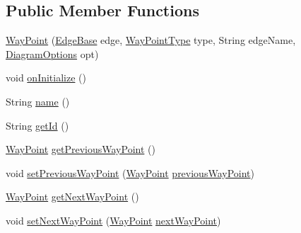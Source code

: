 \subsection*{Public Member Functions}
\begin{DoxyCompactItemize}
\item 
\hyperlink{classorg_1_1tzi_1_1use_1_1gui_1_1views_1_1diagrams_1_1waypoints_1_1_way_point_a4cf28cbed1ee0e244add67a47d843032}{Way\-Point} (\hyperlink{classorg_1_1tzi_1_1use_1_1gui_1_1views_1_1diagrams_1_1elements_1_1edges_1_1_edge_base}{Edge\-Base} edge, \hyperlink{enumorg_1_1tzi_1_1use_1_1gui_1_1views_1_1diagrams_1_1waypoints_1_1_way_point_type}{Way\-Point\-Type} type, String edge\-Name, \hyperlink{classorg_1_1tzi_1_1use_1_1gui_1_1views_1_1diagrams_1_1_diagram_options}{Diagram\-Options} opt)
\item 
void \hyperlink{classorg_1_1tzi_1_1use_1_1gui_1_1views_1_1diagrams_1_1waypoints_1_1_way_point_a78a658193fbe5ac02d43d8e817eb6d84}{on\-Initialize} ()
\item 
String \hyperlink{classorg_1_1tzi_1_1use_1_1gui_1_1views_1_1diagrams_1_1waypoints_1_1_way_point_a216acc1a46161424a666105eed746085}{name} ()
\item 
String \hyperlink{classorg_1_1tzi_1_1use_1_1gui_1_1views_1_1diagrams_1_1waypoints_1_1_way_point_a76dc7f8789324cbc5862e0dd6181dd29}{get\-Id} ()
\item 
\hyperlink{classorg_1_1tzi_1_1use_1_1gui_1_1views_1_1diagrams_1_1waypoints_1_1_way_point}{Way\-Point} \hyperlink{classorg_1_1tzi_1_1use_1_1gui_1_1views_1_1diagrams_1_1waypoints_1_1_way_point_a463d4f253ab42b43e0d7c115a43dd3f2}{get\-Previous\-Way\-Point} ()
\item 
void \hyperlink{classorg_1_1tzi_1_1use_1_1gui_1_1views_1_1diagrams_1_1waypoints_1_1_way_point_a54059b60168f8eca2a9bd69bf9bf1816}{set\-Previous\-Way\-Point} (\hyperlink{classorg_1_1tzi_1_1use_1_1gui_1_1views_1_1diagrams_1_1waypoints_1_1_way_point}{Way\-Point} \hyperlink{classorg_1_1tzi_1_1use_1_1gui_1_1views_1_1diagrams_1_1waypoints_1_1_way_point_acfbb3ccd53ce4deaf5a8240d49367125}{previous\-Way\-Point})
\item 
\hyperlink{classorg_1_1tzi_1_1use_1_1gui_1_1views_1_1diagrams_1_1waypoints_1_1_way_point}{Way\-Point} \hyperlink{classorg_1_1tzi_1_1use_1_1gui_1_1views_1_1diagrams_1_1waypoints_1_1_way_point_a6997a28a0b2b3ee5a7408704a6347dbc}{get\-Next\-Way\-Point} ()
\item 
void \hyperlink{classorg_1_1tzi_1_1use_1_1gui_1_1views_1_1diagrams_1_1waypoints_1_1_way_point_a2a02649f0a3929f2f6d3681e71280e59}{set\-Next\-Way\-Point} (\hyperlink{classorg_1_1tzi_1_1use_1_1gui_1_1views_1_1diagrams_1_1waypoints_1_1_way_point}{Way\-Point} \hyperlink{classorg_1_1tzi_1_1use_1_1gui_1_1views_1_1diagrams_1_1waypoints_1_1_way_point_a474962722f712c8477509df9e9cf60fc}{next\-Way\-Point})

\end{DoxyCompactItemize}
